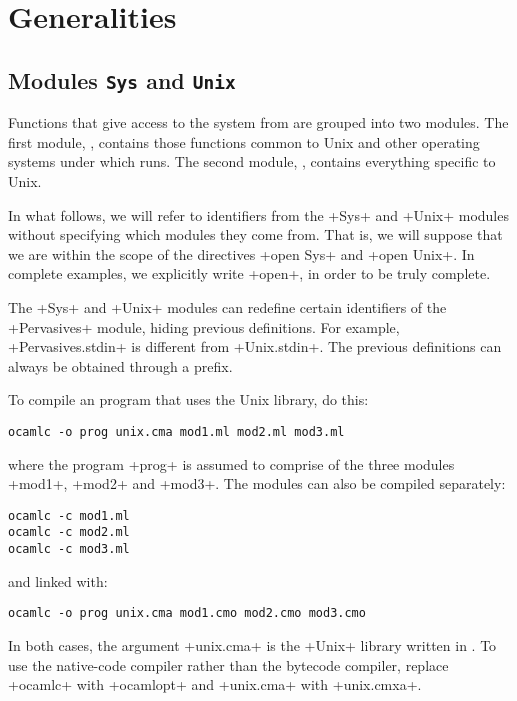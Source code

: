 %
%

\chapter{Generalities}

\section{Modules {\normalfont\texttt{Sys}} and {\normalfont\texttt{Unix}}}

Functions that give access to the system from {\ocaml} are grouped into two
modules. The first module,  , contains those functions
common to Unix and other operating systems under which {\ocaml} runs.
The second module, , contains everything specific to
Unix. 

In what follows, we will refer to identifiers from the \ml+Sys+ and
\ml+Unix+ modules without specifying which modules they come from.  That is, we
will suppose that we are within the scope of the directives 
\ml+open Sys+ and \ml+open Unix+. In complete examples, we explicitly write
\ml+open+, in order to be truly complete.

The \ml+Sys+ and \ml+Unix+ modules can redefine certain
identifiers of the \ml+Pervasives+ module, hiding previous
definitions. For example,  \ml+Pervasives.stdin+  is different from 
\ml+Unix.stdin+. The previous definitions can always be obtained
through a prefix.

To compile an {\ocaml} program that uses the 
Unix library, do this:
%
\begin{lstlisting}
ocamlc -o prog unix.cma mod1.ml mod2.ml mod3.ml 
\end{lstlisting}
%
where the program \ml+prog+ is assumed to comprise of the three modules \ml+mod1+,
\ml+mod2+ and \ml+mod3+. The modules can also be compiled separately:
%
\begin{lstlisting}
ocamlc -c mod1.ml
ocamlc -c mod2.ml
ocamlc -c mod3.ml
\end{lstlisting}
%
and linked with:
%
\begin{lstlisting}
ocamlc -o prog unix.cma mod1.cmo mod2.cmo mod3.cmo
\end{lstlisting}
%
In both cases, the argument \ml+unix.cma+ is the \ml+Unix+ library
written in {\ocaml}. To use the native-code compiler rather than the
bytecode compiler, replace \ml+ocamlc+ with \ml+ocamlopt+ and
\ml+unix.cma+ with \ml+unix.cmxa+.

